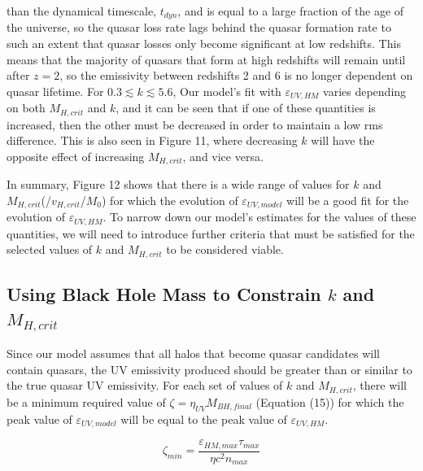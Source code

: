 \documentclass[12pt, twocolumn]{report}%
\begin{document}
\noindent than the dynamical timescale, $t_{dyn}$, and is equal to a large fraction of the age of the universe, so the quasar loss rate lags behind the quasar formation rate to such an extent that quasar losses only become significant at low redshifts. This means that the majority of quasars that form at high redshifts will remain until after $z=2$, so the emissivity between redshifts 2 and 6 is no longer dependent on quasar lifetime. For $0.3\lesssim k\lesssim5.6$, Our model's fit with $\varepsilon_{UV,HM}$ varies depending on both $M_{H,crit}$ and $k$, and it can be seen that if one of these quantities is increased, then the other must be decreased in order to maintain a low rms difference. This is also seen in Figure 11, where decreasing $k$ will have the opposite effect of increasing $M_{H,crit}$, and vice versa.\par

In summary, Figure 12 shows that there is a wide range of values for $k$ and $M_{H,crit}$(/$v_{H,crit}$/$M_0$) for which the evolution of $\varepsilon_{UV,model}$ will be a good fit for the evolution of $\varepsilon_{UV,HM}$. To narrow down our model's estimates for the values of these quantities, we will need to introduce further criteria that must be satisfied for the selected values of $k$ and $M_{H,crit}$ to be considered viable.

\subsection{Using Black Hole Mass to Constrain $k$ and $M_{H,crit}$}

Since our model assumes that all halos that become quasar candidates will contain quasars, the UV emissivity produced should be greater than or similar to the true quasar UV emissivity. For each set of values of $k$ and $M_{H,crit}$, there will be a minimum required value of $\zeta=\eta_{UV}M_{BH,final}$ (Equation (15)) for which the peak value of $\varepsilon_{UV,model}$ will be equal to the peak value of $\varepsilon_{UV,HM}$.

\begin{equation}
    \zeta_{min}=\frac{\varepsilon_{HM,max}\tau_{max}}{\eta c^2n_{max}}
\end{equation}
\end{document}
